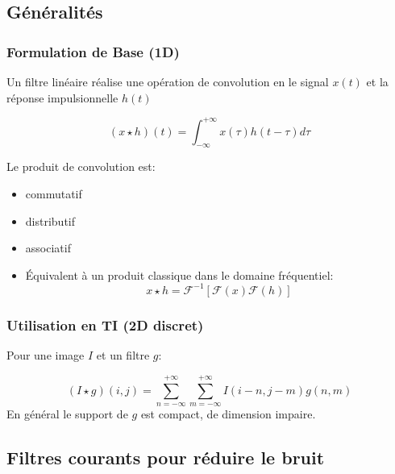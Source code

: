 \documentclass[main.tex]{subfiles}
\begin{document}
\subsection{Généralités}
\subsubsection{Formulation de Base (1D)}
\begin{defin}
  Un filtre linéaire réalise une opération de convolution en le signal $x(t)$ et la réponse impulsionnelle $h(t)$

  \[
    (x \star h) (t) = \int_{-\infty}^{+\infty}x(\tau)h(t-\tau)d\tau
  \]
\end{defin}
\begin{prop}
  Le produit de convolution est:
  \begin{itemize}
  \item commutatif
  \item distributif
  \item associatif
  \item Équivalent à un produit classique dans le domaine fréquentiel:
    \[
      x \star h  = \mathcal{F}^{-1}[\mathcal{F}(x)\mathcal{F}(h)]
    \]
  \end{itemize}
\end{prop}

\subsubsection{Utilisation en TI (2D discret)}

\begin{defin}
  Pour une image $I$ et un filtre $g$:

  \[
    (I\star g)(i,j) =\sum_{n=-\infty}^{+\infty}\sum_{m=-\infty}^{+\infty}I(i-n,j-m)g(n,m)
  \]
  En général le support de $g$ est compact, de dimension impaire.
\end{defin}

\subsection{Filtres courants pour réduire le bruit}
\end{document}
